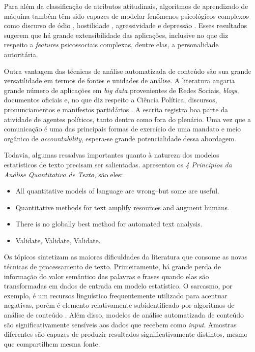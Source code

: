 \documentclass[
12pt,				%
openright,			%
twoside,			%
a4paper,			%
english,			%
french,				%
spanish,			%
brazil				%
]{abntex2}
\begin{document}
Para além da classificação de atributos atitudinais, algoritmos de aprendizado de máquina também têm sido capazes de modelar fenômenos psicológicos complexos como discurso de ódio \cite{davidson2017automated, zampieri2019predicting}, hostilidade \cite{hopp2017does, vargo2017socioeconomic, liu2018forecasting}, agressividade \cite{orasan2018aggressive, sahay2018detecting, nikhil2018lstms} e depressão \cite{mowery2016identifying, chekroud2016cross, orabi2018deep}. Esses resultados sugerem que há grande extensibilidade das aplicações, inclusive no que diz respeito a \emph{features} psicossociais complexas, dentre elas, a personalidade autoritária.

Outra vantagem das técnicas de análise automatizada de conteúdo são sua grande versatilidade em termos de fontes e unidades de análise. A literatura angaria grande número de aplicações em \emph{big data} provenientes de Redes Sociais, \emph{blogs}, documentos oficiais e, no que diz respeito a Ciência Política, discursos, pronunciamentos e manifestos partidários \cite{grimmer2013text, wilkerson2017large, gentzkow2019text}. A escrita registra boa parte da atividade de agentes políticos, tanto dentro como fora do plenário. Uma vez que a comunicação é uma das principais formas de exercício de uma mandato e meio orgânico de \emph{accountability}, espera-se grande potencialidade dessa abordagem.

Todavia, algumas ressalvas importantes quanto à natureza dos modelos estatísticos de texto precisam ser salientadas.  apresentou os \emph{4 Princípios da Análise Quantitativa de Texto}, são eles:

\begin{itemize}
	\item All quantitative models of language are wrong–but some are useful.
	\item Quantitative methods for text amplify resources and augment humans.
	\item There is no globally best method for automated text analysis.
	\item Validate, Validate, Validate.
\end{itemize}

Os tópicos sintetizam as maiores dificuldades da literatura que consome as novas técnicas de processamento de texto. Primeiramente, há grande perda de informação do valor semântico das palavras e frases quando elas são transformadas em dados de entrada em modelo estatístico. O sarcasmo, por exemplo, é um recursos linguístico frequentemente utilizado para acentuar negativas, porém é elemento relativamente subidentificado por algoritmos de análise de conteúdo \cite{maynard2014cares}. Além disso, modelos de análise automatizada de conteúdo são significativamente sensíveis aos dados que recebem como \emph{input}. Amostras diferentes são capazes de produzir resultados significativamente distintos, mesmo que compartilhem mesma fonte.  
\end{document}
